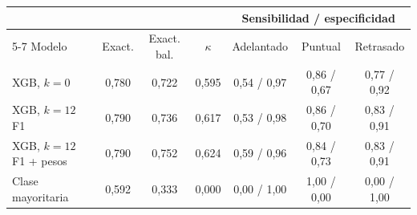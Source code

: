 \begin{tabular}{@{}lcccccc@{}}
\toprule
 & & & & \multicolumn{3}{c}{Sensibilidad / especificidad} \\
\cmidrule(l){5-7}
Modelo & Exact. & Exact. bal. & $\kappa$ & Adelantado & Puntual & Retrasado \\
\midrule
XGB, $k=0$ & 0,780 & 0,722 & 0,595 & 0,54 / 0,97 & 0,86 / 0,67 & 0,77 / 0,92 \\
XGB, $k=12$ F1 & 0,790 & 0,736 & 0,617 & 0,53 / 0,98 & 0,86 / 0,70 & 0,83 / 0,91 \\
XGB, $k=12$ F1 + pesos & 0,790 & 0,752 & 0,624 & 0,59 / 0,96 & 0,84 / 0,73 & 0,83 / 0,91 \\
Clase mayoritaria & 0,592 & 0,333 & 0,000 & 0,00 / 1,00 & 1,00 / 0,00 & 0,00 / 1,00 \\
\bottomrule
\end{tabular}
